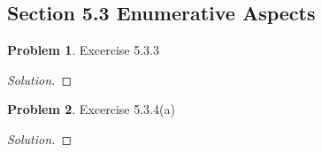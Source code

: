 \documentclass[12pt]{article}
\theoremstyle{definition}
\newtheorem{problem}{Problem}
\newenvironment*{solution}{\begin{proof}[Solution]}{\end{proof}}
\begin{document}
\subsection*{Section 5.3 Enumerative Aspects}
\begin{problem}
    Excercise 5.3.3
\end{problem}
\begin{solution}
    
\end{solution}
\begin{problem}
    Excercise 5.3.4(a)
\end{problem}
\begin{solution}
    
\end{solution}
\end{document}
